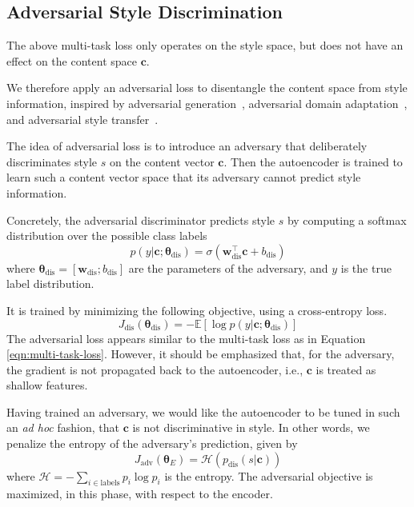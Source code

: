 \documentclass[11pt,a4paper]{article}
\newcommand{\loss}[1]{J_\text{#1}}
\begin{document}
\subsection{Adversarial Style Discrimination} \label{ss:adv}

The above multi-task loss only operates on the style space, but does not have an effect on the content space $\bm c$.

We therefore apply an adversarial loss to disentangle the content space from style information, inspired by adversarial generation~\cite{goodfellow2014generative}, adversarial domain adaptation~\cite{liu2017adversarial}, and adversarial style transfer~\cite{fu2017style}.

The idea of adversarial loss is to introduce an adversary that deliberately discriminates style $s$ on the content vector $\bm c$. Then the autoencoder is trained to learn such a content vector space that its adversary cannot predict style information.

Concretely, the adversarial discriminator predicts style $s$ by computing a softmax distribution over the possible class labels
\begin{equation}
	p(y | \bm c; \bm\theta_\text{dis}) = \sigma(\bm w_\text{dis}^\top \bm c + b_\text{dis})
\end{equation}
where $\bm\theta_\text{dis}=[\bm w_\text{dis}; b_\text{dis}]$ are the parameters of the adversary, and $y$ is the true label distribution.

It is trained by minimizing the following objective, using a cross-entropy loss.
\begin{equation} \label{eqn:adv-disc-loss}
	\loss{dis}(\bm\theta_\text{dis}) =
	- \mathbb{E} [\log p(y | \bm c; \bm\theta_\text{dis})]
\end{equation}
The adversarial loss appears similar to the multi-task loss as in Equation \ref{eqn:multi-task-loss}. However, it should be emphasized that, for the adversary, the gradient is not propagated back to the autoencoder, i.e., $\bm c$ is treated as shallow features.

Having trained an adversary, we would like the autoencoder to be tuned in such an \textit{ad hoc} fashion, that $\bm c$ is not discriminative in style. In other words, we penalize the entropy of the adversary's prediction, given by
\begin{equation}
	\loss{adv}(\bm\theta_E)=\mathcal{H}(p_\text{dis}(s|\bm c))
\end{equation}
where $\mathcal{H}=-\sum_{i\in\text{labels}}p_i\log p_i$ is the entropy. The adversarial objective is maximized, in this phase, with respect to the encoder.
\end{document}
